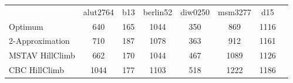 \begin{tabular}[ht]{|l||c|c|c|c|c|c|H}
 & alut2764 & b13 & berlin52 & diw0250 & msm3277 & d15 & \\  
Optimum &640 & 165 & 1044 & 350 & 869 & 1116 & \\ 
2-Approximation &710 & 187 & 1078 & 363 & 912 & 1161 & \\ 
MSTAV HillClimb &662 & 170 & 1044 & 467 & 1089 & 1126 & \\ 
CBC HillClimb &1044 & 177 & 1103 & 518 & 1222 & 1186 & \\ 
\end{tabular}